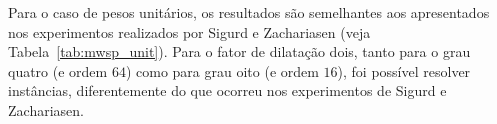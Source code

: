 Para o caso de pesos unitários, os resultados são semelhantes aos apresentados
nos experimentos realizados por Sigurd e Zachariasen
(veja Tabela~\ref{tab:mwsp_unit}). Para o fator de dilatação dois, tanto para
o grau quatro (e ordem $64$) como para grau oito (e ordem $16$), foi possível
resolver instâncias, diferentemente do que ocorreu nos experimentos de
Sigurd e Zachariasen.





